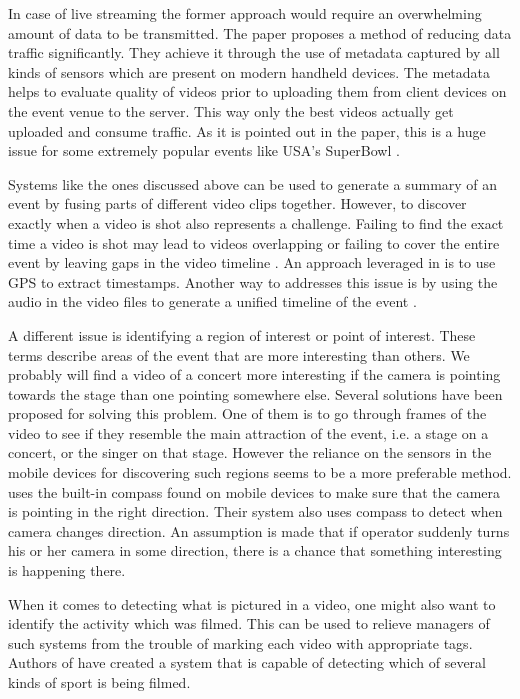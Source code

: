 \documentclass[conference]{IEEEtran}
\begin{document}
In case of live streaming the former approach would require an overwhelming amount of data to be transmitted.
The paper \cite{seshadri_demand_2014} proposes a method of reducing data traffic significantly.
They achieve it through the use of metadata captured by all kinds of sensors which are present on modern handheld devices.
The metadata helps to evaluate quality of videos prior to uploading them from client devices on the event venue to the server.
This way only the best videos actually get uploaded and consume traffic.
As it is pointed out in the paper, this is a huge issue for some extremely popular events like USA's SuperBowl \cite{Erman:2013}.

Systems like the ones discussed above can be used to generate a summary of an event by fusing parts of different video clips together.
However, to discover exactly when a video is shot also represents a challenge. 
Failing to find the exact time a video is shot may lead to videos overlapping or failing to cover the entire event 
by leaving gaps in the video timeline \cite{shrestha_automatic_2010}. 
An approach leveraged in \cite{jain_focus:_2013} is to use GPS to extract timestamps. 
Another way to addresses this issue is by using the audio in the video files 
to generate a unified timeline of the event \cite{shrestha_automatic_2010}. 

A different issue is identifying a region of interest or point of interest.
These terms describe areas of the event that are more interesting than others. 
We probably will find a video of a concert more interesting if the camera is pointing towards the stage than one pointing somewhere else.
Several solutions have been proposed for solving this problem.
One of them is to go through frames of the video to see if they resemble the main attraction of the event, 
i.e. a stage on a concert, or the singer on that stage. 
However the reliance on the sensors in the mobile devices for discovering such regions seems to be a more preferable method.
\cite{cricri_sensor-based_2012} uses the built-in compass found on mobile devices to make sure 
that the camera is pointing in the right direction.
Their system also uses compass to detect when camera changes direction. 
An assumption is made that if operator suddenly turns his or her camera in some direction,
there is a chance that something interesting is happening there.

When it comes to detecting what is pictured in a video, one might also want to identify the activity which was filmed.
This can be used to relieve managers of such systems from the trouble of marking each video with appropriate tags. 
Authors of \cite{cricri_sport_2014} have created a system that is capable of detecting which of several kinds of sport is being filmed.
\end{document}

